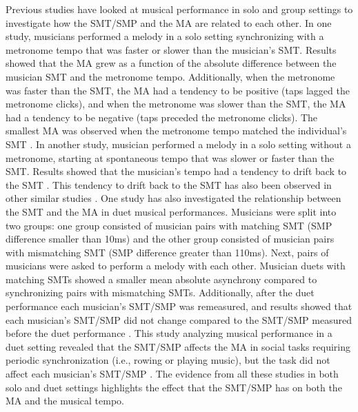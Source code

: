 \documentclass{report}
\begin{document}
Previous studies have looked at musical performance in solo and group settings to investigate how the SMT/SMP and the MA are related to each other. In one study, musicians performed a melody in a solo setting synchronizing with a metronome tempo that was faster or slower than the musician's SMT. Results showed that the MA grew as a function of the absolute difference between the musician SMT and the metronome tempo. Additionally, when the metronome was faster than the SMT, the MA had a tendency to be positive (taps lagged the metronome clicks), and when the metronome was slower than the SMT, the MA had a tendency to be negative (taps preceded the metronome clicks). The smallest MA was observed when the metronome tempo matched the individual's SMT \cite{scheurich2018tapping}. In another study, musician performed a melody in a solo setting without a metronome, starting at spontaneous tempo that was slower or faster than the SMT. Results showed that the musician's tempo had a tendency to drift back to the SMT \cite{zamm2018musicians}. This tendency to drift back to the SMT has also been observed in other similar studies \cite{mcauley2006time, yu2003task}. One study has also investigated the relationship between the SMT and the MA in duet musical performances. Musicians were split into two groups: one group consisted of musician pairs with matching SMT (SMP difference smaller than 10ms) and the other group consisted of musician pairs with mismatching SMT (SMP difference greater than 110ms). Next, pairs of musicians were asked to perform a melody with each other. Musician duets with matching SMTs showed a smaller mean absolute asynchrony compared to synchronizing pairs with mismatching SMTs. Additionally, after the duet performance each musician's SMT/SMP was remeasured, and results showed that each musician's SMT/SMP did not change compared to the SMT/SMP measured before the duet performance \cite{zamm2016endogenous}. This study analyzing musical performance in a duet setting revealed that the SMT/SMP affects the MA in social tasks requiring periodic synchronization (i.e., rowing or playing music), but the task did not affect each musician's SMT/SMP \cite{zamm2016endogenous}. The evidence from all these studies in both solo and duet settings highlights the effect that the SMT/SMP has on both the MA and the musical tempo.
\end{document}
